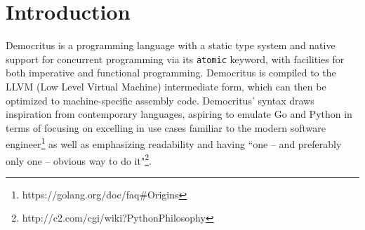 \chapter{Introduction}

Democritus is a programming language with a static type system and native support for concurrent programming via its \texttt{atomic} keyword, with facilities for both imperative and functional programming. Democritus is compiled to the LLVM (Low Level Virtual Machine) intermediate form, which can then be optimized to machine-specific assembly code. Democritus' syntax draws inspiration from contemporary languages, aspiring to emulate Go and Python in terms of focusing on excelling in use cases familiar to the modern software engineer\footnote[1]{https://golang.org/doc/faq\#Origins} as well as emphasizing readability and having ``one -- and preferably only one -- obvious way to do it"\footnote[2]{http://c2.com/cgi/wiki?PythonPhilosophy}.